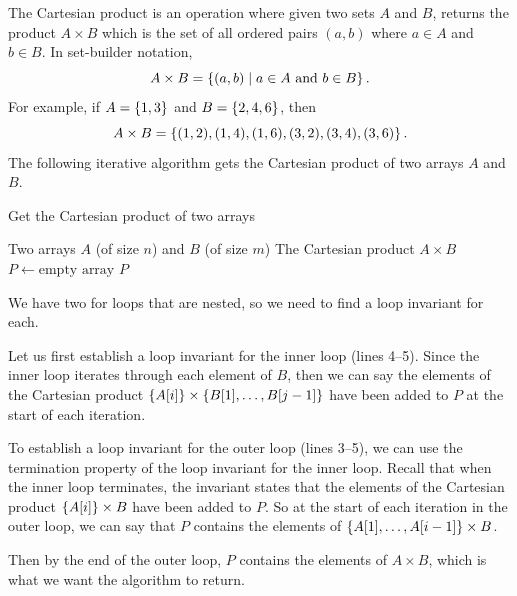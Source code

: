 \begin{example}
    The Cartesian product is an operation where given two sets $A$ and $B$, returns the product $A \times B$ which is the set of all ordered pairs $\left(a, b\right)$ where $a \in A$ and $b \in B$. In set-builder notation,
    \[
        A \times B = \left\{\left(a,b\right) \mid a \in A \text{ and } b \in B\right\}.
    \]
    For example, if $A = \left\{1,3\right\}$ and $B = \left\{2,4,6\right\}$, then 
    \[
        A \times B = \left\{(1,2),(1,4),(1,6),(3,2),(3,4),(3,6)\right\}.
    \]
    The following iterative algorithm gets the Cartesian product of two arrays $A$ and $B$.
    \begin{algorithm}[H]
        \caption{Get the Cartesian product of two arrays}
        \begin{algorithmic}[1]
            \Require Two arrays $A$ (of size $n$) and $B$ (of size $m$)
            \Ensure The Cartesian product $A \times B$
                \State $P \gets \text{empty array}$
                        \State {}
                    \EndFor
                \EndFor
                \Return $P$
           \EndFunction
       \end{algorithmic}
   \end{algorithm}

   We have two for loops that are nested, so we need to find a loop invariant for each. 

   Let us first establish a loop invariant for the inner loop (lines 4--5). Since the inner loop iterates through each element of $B$, then we can say the elements of the Cartesian product $\left\{A[i]\right\} \times \left\{B[1],\ldots,B[j-1]\right\}$ have been added to $P$ at the start of each iteration.

   To establish a loop invariant for the outer loop (lines 3--5), we can use the termination property of the loop invariant for the inner loop. Recall that when the inner loop terminates, the invariant states that the elements of the Cartesian product $\left\{A[i]\right\} \times B$ have been added to $P$. So at the start of each iteration in the outer loop, we can say that $P$ contains the elements of $\left\{A[1],\ldots,A[i-1]\right\} \times B$.

   Then by the end of the outer loop, $P$ contains the elements of $A \times B$, which is what we want the algorithm to return.


\end{example}
